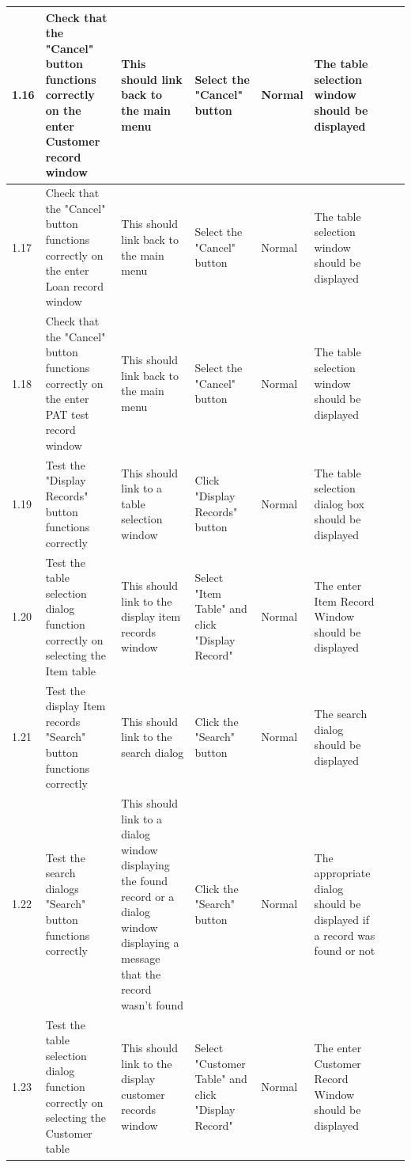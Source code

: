 \begin{landscape}
\begin{center}
\begin{longtable}{|p{1.5cm}|p{2cm}|p{3cm}|p{2cm}|p{2cm}|p{2.5cm}|p{2cm}|p{2cm}|}
        1.16 & Check that the "Cancel" button functions correctly on the enter Customer record window & This should link back to the main menu & Select the "Cancel" 
        button & Normal & The table selection window should be displayed & & \\ \hline
        
        1.17 & Check that the "Cancel" button functions correctly on the enter Loan record window & This should link back to the main menu & Select the "Cancel" 
        button & Normal & The table selection window should be displayed & & \\ \hline
        
        1.18 & Check that the "Cancel" button functions correctly on the enter PAT test record window & This should link back to the main menu & Select the "Cancel" 
        button & Normal & The table selection window should be displayed & & \\ \hline
        
        1.19 & Test the "Display Records" button functions correctly & This should link to a table selection window & Click "Display Records" button & Normal & The 
        table selection dialog box should be displayed & & \\ \hline 

        1.20 & Test the table selection dialog function correctly on selecting the Item table & This should link to the display item records window & Select "Item 
        Table" and click "Display Record" & Normal & The enter Item Record Window should be displayed & & \\ \hline
        
        1.21 & Test the display Item records "Search" button functions correctly & This should link to the search dialog & Click the "Search" button & Normal & The 
        search dialog should be displayed & & \\ \hline
        
        1.22 & Test the search dialogs "Search" button functions correctly & This should link to a dialog window displaying the found record or a dialog window 
        displaying a message that the record wasn't found & Click the "Search" button & Normal & The appropriate dialog should be displayed if a record was found or not
         & & \\ \hline
        
        1.23 & Test the table selection dialog function correctly on selecting the Customer table & This should link to the display customer records window & Select 
        "Customer Table" and click "Display Record" & Normal & The enter Customer Record Window should be displayed & & \\ \hline
        

\end{longtable}
\end{center}
\end{landscape}

